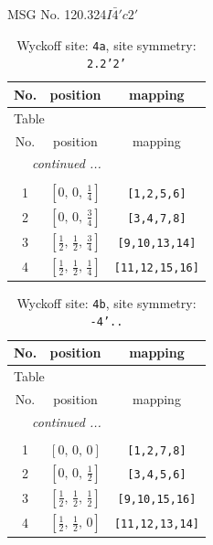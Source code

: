 \documentclass[fleqn,8pt]{jsarticle}
\begin{document}
\setcounter{MaxMatrixCols}{32}

\renewcommand{\tablename}{Table~}
\renewcommand{\figurename}{Figure~}
\begin{center}
\LARGE
MSG No. 120.324\quad$I\bar{4}'c2'$
\end{center}
\renewcommand{\arraystretch}{1.2}
\begin{longtable}{ccc}
\caption{Wyckoff site: {\tt 4a}, site symmetry: {\tt 2.2'2'}}
 \\
 \hline \hline
No. & position & mapping \\ \hline \endfirsthead

\multicolumn{2}{l}{\tablename\ \thetable{}} \\
 \hline \hline
No. & position & mapping \\ \hline \endhead

 \hline \hline
\multicolumn{2}{r}{\footnotesize\it continued ...} \\ \endfoot

 \hline \hline
\multicolumn{2}{r}{} \\ \endlastfoot

1 & $\left[ 0,\, 0,\, \frac{1}{4} \right]$ & {\tt [1,2,5,6]} \\ \hline
2 & $\left[ 0,\, 0,\, \frac{3}{4} \right]$ & {\tt [3,4,7,8]} \\ \hline
3 & $\left[ \frac{1}{2},\, \frac{1}{2},\, \frac{3}{4} \right]$ & {\tt [9,10,13,14]} \\ \hline
4 & $\left[ \frac{1}{2},\, \frac{1}{2},\, \frac{1}{4} \right]$ & {\tt [11,12,15,16]} \\
\end{longtable}
\renewcommand{\arraystretch}{1.2}
\begin{longtable}{ccc}
\caption{Wyckoff site: {\tt 4b}, site symmetry: {\tt -4'..}}
 \\
 \hline \hline
No. & position & mapping \\ \hline \endfirsthead

\multicolumn{2}{l}{\tablename\ \thetable{}} \\
 \hline \hline
No. & position & mapping \\ \hline \endhead

 \hline \hline
\multicolumn{2}{r}{\footnotesize\it continued ...} \\ \endfoot

 \hline \hline
\multicolumn{2}{r}{} \\ \endlastfoot

1 & $\left[ 0,\, 0,\, 0 \right]$ & {\tt [1,2,7,8]} \\ \hline
2 & $\left[ 0,\, 0,\, \frac{1}{2} \right]$ & {\tt [3,4,5,6]} \\ \hline
3 & $\left[ \frac{1}{2},\, \frac{1}{2},\, \frac{1}{2} \right]$ & {\tt [9,10,15,16]} \\ \hline
4 & $\left[ \frac{1}{2},\, \frac{1}{2},\, 0 \right]$ & {\tt [11,12,13,14]} \\
\end{longtable}
\end{document}
